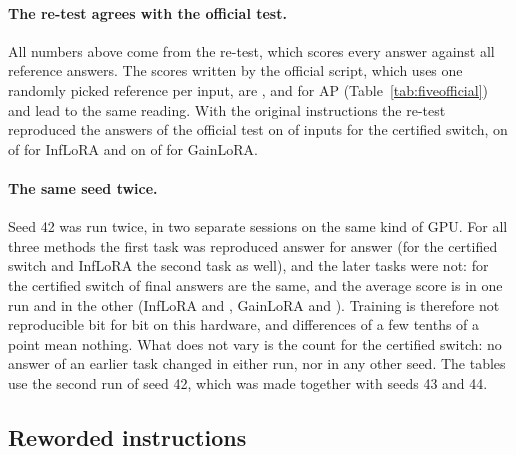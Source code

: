 \paragraph{The re-test agrees with the official test.} All numbers above come from the re-test, which scores every answer against all
reference answers. The scores written by the official script, which uses one randomly picked
reference per input, are \FiveCertOffAP{}, \FiveInfOffAP{} and \FiveGainOffAP{} for AP
(Table~\ref{tab:fiveofficial}) and lead to the same reading. With the original instructions the
re-test reproduced the answers of the official test on \FiveCertSame{} of \FiveCertSameOf{} inputs
for the certified switch, on \FiveInfSame{} of \FiveInfSameOf{} for InfLoRA and on \FiveGainSame{}
of \FiveGainSameOf{} for GainLoRA.

\paragraph{The same seed twice.} Seed 42 was run twice, in two separate sessions on the same kind
of GPU. For all three methods the first task was reproduced answer for answer (for the certified
switch and InfLoRA the second task as well), and the later tasks were not: for the certified
switch \RepeatCertSame{} of \RepeatCertTotal{} final
answers are the same, and the average score is \RepeatCertFirst{} in one run and
\RepeatCertSecond{} in the other (InfLoRA \RepeatInfFirst{} and \RepeatInfSecond{}, GainLoRA
\RepeatGainFirst{} and \RepeatGainSecond{}). Training is therefore not reproducible bit for bit on
this hardware, and differences of a few tenths of a point mean nothing. What does not vary is the
count for the certified switch: no answer of an earlier task changed in either run, nor in any
other seed. The tables use the second run of seed 42, which was made together with seeds 43
and 44.


\subsection{Reworded instructions}
\label{sec:reworded}

\begin{table}[t]
  \caption{Five tasks with the original and with reworded instructions: average score at the end and
  number of changed answers. The adapters are those of Table~\ref{tab:fivemain}; nothing is
  retrained. Means and sums over the seeds of Table~\ref{tab:fivemain}.}
  \label{tab:fivewordings}
  \centering
  \small
  \setlength{\tabcolsep}{4.5pt}
  
\end{table}


